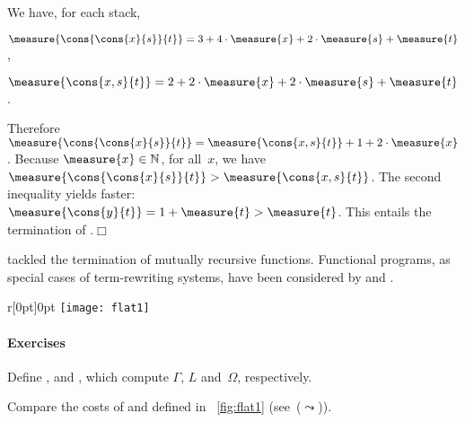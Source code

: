 We have, for each stack,
\begin{itemize*}

  \item \(\measure{\cons{\cons{x}{s}}{t}} = 3 + 4\cdot\measure{x} +
    2\cdot\measure{s} + \measure{t}\),

  \item \(\measure{\cons{x,s}{t}} = 2 + 2\cdot\measure{x} +
    2\cdot\measure{s} + \measure{t}\).

\end{itemize*}
Therefore \(\measure{\cons{\cons{x}{s}}{t}} = \measure{\cons{x,s}{t}}
+ 1 + 2\cdot\measure{x}\). Because \(\measure{x} \in \mathbb{N}\),
for all~\(x\), we have \(\measure{\cons{\cons{x}{s}}{t}} >
\measure{\cons{x,s}{t}}\). The second inequality yields faster:
\(\measure{\cons{y}{t}} = 1 + \measure{t} > \measure{t}\). This
entails the termination of
.\hfill\(\Box\)

\cite{Giesl_1997} tackled the termination of mutually recursive
functions. Functional programs, as special cases of
term\hyp{}rewriting systems, have been considered by
\cite{Giesl_1995b} and \cite{GieslWaltherBrauburger_1998}.

%
\begin{wrapfigure}[6]{r}[0pt]{0pt}
\centering
\texttt{[image: flat1]}%
\caption{Variant flattening\label{fig:flat1}
}
\end{wrapfigure}
\paragraph{Exercises}

\begin{enumerate*}

  \item Define ,  and , which
    compute \(\Gamma\), \(L\) and~\(\Omega\), respectively.

  \item Compare the costs of  and
      defined in
    \fig~\ref{fig:flat1} (see~(\(\leadsto\))).

\end{enumerate*}
